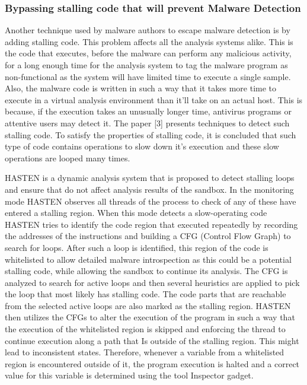 \documentclass[11pt]{article}
\begin{document}
		\subsubsection{Bypassing stalling code that will prevent Malware Detection}
		Another technique used by malware authors to escape malware detection is by adding stalling code. This problem affects all the analysis systems alike. This is the code that executes, before the malware can perform any malicious activity, for a long enough time for the analysis system to tag the malware program as non-functional as the system will have limited time to execute a single sample. Also, the malware code is written in such a way that it takes more time to execute in a virtual analysis environment than it’ll take on an actual host. This is because, if the execution takes an unusually longer time, antivirus programs or attentive users may detect it. The paper [3] presents techniques to detect such stalling code. To satisfy the properties of stalling code, it is concluded that such type of code contains operations to slow down it’s execution and these slow operations are looped many times. 

		HASTEN is a dynamic analysis system that is proposed to detect stalling loops and ensure that do not affect analysis results of the sandbox. In the monitoring mode HASTEN observes all threads of the process to check of any of these have entered a stalling region. When this mode detects a slow-operating code HASTEN tries to identify the code region that executed repeatedly by recording the addresses of the instructions and building a CFG (Control Flow Graph) to search for loops. After such a loop is identified, this region of the code is whitelisted to allow detailed malware introspection as this could be a potential stalling code, while allowing the sandbox to continue its analysis. The CFG is analyzed to search for active loops and then several heuristics are applied to pick the loop that most likely has stalling code. The code parts that are reachable from the selected active loops are also marked as the stalling region. HASTEN then utilizes the CFGs to alter the execution of the program in such a way that the execution of the whitelisted region is skipped and enforcing the thread to continue execution along a path that Is outside of the stalling region. This might lead to inconsistent states. Therefore, whenever a variable from a whitelisted region is encountered outside of it, the program execution is halted and a correct value for this variable is determined using the tool Inspector gadget.
\end{document}
